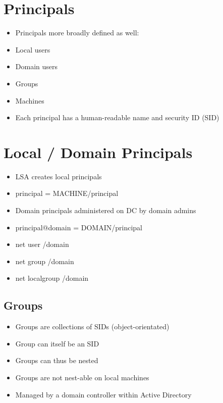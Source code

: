 \documentclass{article}
\begin{document}
\section{Principals}
\begin{itemize}
  \item Principals more broadly defined as well: 
  \item Local users 
  \item Domain users 
  \item Groups 
  \item Machines 
  \item Each principal has a human-readable name and security ID (SID)
\end{itemize}

\section{Local / Domain Principals}
\begin{itemize}
  \item LSA creates local principals 
  \item principal = MACHINE/principal 
  \item Domain principals administered on DC by domain admins 
  \item principal@domain = DOMAIN/principal
  \item net user /domain 
  \item net group /domain
  \item net localgroup /domain
\end{itemize}

\subsection{Groups}
\begin{itemize}
  \item Groups are collections of SIDs (object-orientated) 
  \item Group can itself be an SID 
  \item Groups can thus be nested 
  \item Groups are not nest-able on local machines 
  \item Managed by a domain controller within Active Directory
\end{itemize}
\end{document}
